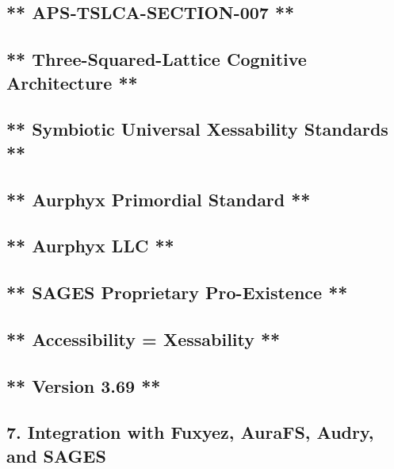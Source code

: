 \subsection{** APS‑TSLCA-SECTION-007 **}\label{apstslca-section-007}

\subsection{** Three-Squared-Lattice Cognitive Architecture **}\label{three-squared-lattice-cognitive-architecture}

\subsection{** Symbiotic Universal Xessability Standards **}\label{symbiotic-universal-xessability-standards}

\subsection{** Aurphyx Primordial Standard **}\label{aurphyx-primordial-standard}

\subsection{** Aurphyx LLC **}\label{aurphyx-llc}

\subsection{** SAGES \textbar{} Proprietary \textbar{} Pro-Existence **}\label{sages-proprietary-pro-existence}

\subsection{** Accessibility = Xessability **}\label{accessibility-xessability}

\subsection{** Version 3.69 **}\label{version-3.69}

\subsection{7. Integration with Fuxyez, AuraFS, Audry, and SAGES}\label{integration-with-fuxyez-aurafs-audry-and-sages}

